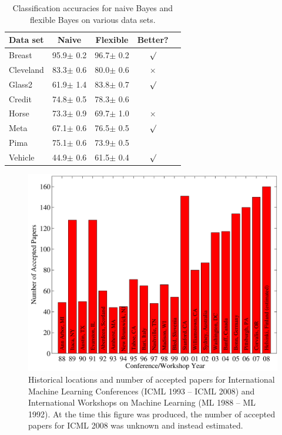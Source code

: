 \begin{table}[t]
\caption{Classification accuracies for naive Bayes and flexible
Bayes on various data sets.}
\label{sample-table}
\vskip 0.15in
\begin{center}
\begin{small}
\begin{sc}
\begin{tabular}{lcccr}
\toprule
Data set & Naive & Flexible & Better? \\
\midrule
Breast    & 95.9$\pm$ 0.2& 96.7$\pm$ 0.2& $\surd$ \\
Cleveland & 83.3$\pm$ 0.6& 80.0$\pm$ 0.6& $\times$\\
Glass2    & 61.9$\pm$ 1.4& 83.8$\pm$ 0.7& $\surd$ \\
Credit    & 74.8$\pm$ 0.5& 78.3$\pm$ 0.6&         \\
Horse     & 73.3$\pm$ 0.9& 69.7$\pm$ 1.0& $\times$\\
Meta      & 67.1$\pm$ 0.6& 76.5$\pm$ 0.5& $\surd$ \\
Pima      & 75.1$\pm$ 0.6& 73.9$\pm$ 0.5&         \\
Vehicle   & 44.9$\pm$ 0.6& 61.5$\pm$ 0.4& $\surd$ \\
\bottomrule
\end{tabular}
\end{sc}
\end{small}
\end{center}
\vskip -0.1in
\end{table}
\fi

\begin{figure}[ht]
\vskip 0.2in
\begin{center}
\centerline{\includegraphics[width=\columnwidth]{icml_numpapers}}
\caption{Historical locations and number of accepted papers for International
Machine Learning Conferences (ICML 1993 -- ICML 2008) and International
Workshops on Machine Learning (ML 1988 -- ML 1992). At the time this figure was
produced, the number of accepted papers for ICML 2008 was unknown and instead
estimated.}
\label{icml-historical}
\end{center}
\vskip -0.2in
\end{figure}
\fi